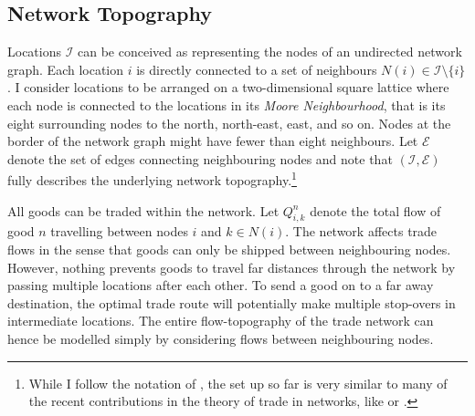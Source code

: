 \documentclass[11pt, oneside]{article}   	%
\begin{document}
\subsection{Network Topography}
Locations $\mathcal{I}$ can be conceived as representing the nodes of an undirected network graph. Each location $i$ is directly connected to a set of neighbours $N(i) \in \mathcal{I} \setminus \{ i\}$. I consider locations to be arranged on a two-dimensional square lattice where each node is connected to the locations in its \emph{Moore Neighbourhood}, that is its eight surrounding nodes to the north, north-east, east, and so on. Nodes at the border of the network graph might have fewer than eight neighbours. Let $\mathcal{E}$ denote the set of edges connecting neighbouring nodes and note that $(\mathcal{I}, \mathcal{E})$ fully describes the underlying network topography.\footnote{While I follow the notation of \cite{fajgelbaum_optimal_2017}, the set up so far is very similar to many of the recent contributions in the theory of trade in networks, like \cite{allen_welfare_2016} or \cite{Galichon_OptimalTransportMethods_2016}.}

All goods can be traded within the network. Let $Q_{i,k}^{n}$ denote the total flow of good $n$ travelling between nodes $i$ and $k \in N(i)$. The network affects trade flows in the sense that goods can only be shipped between neighbouring nodes. However, nothing prevents goods to travel far distances through the network by passing multiple locations after each other. To send a good on to a far away destination, the optimal trade route will potentially make multiple stop-overs in intermediate locations. The entire flow-topography of the trade network can hence be modelled simply by considering flows between neighbouring nodes.
\end{document}
